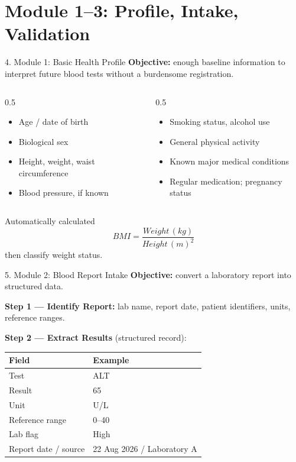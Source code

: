 \documentclass[10pt,aspectratio=169]{beamer}
\begin{document}
\section{Module 1--3: Profile, Intake, Validation}

\begin{frame}{4. Module 1: Basic Health Profile}
\textbf{Objective:} enough baseline information to interpret future blood tests without a burdensome registration.
\vspace{4pt}
\scriptsize
\begin{columns}[T]
\begin{column}{0.5\textwidth}
\begin{itemize}
\item Age / date of birth
\item Biological sex
\item Height, weight, waist circumference
\item Blood pressure, if known
\end{itemize}
\end{column}
\begin{column}{0.5\textwidth}
\begin{itemize}
\item Smoking status, alcohol use
\item General physical activity
\item Known major medical conditions
\item Regular medication; pregnancy status
\end{itemize}
\end{column}
\end{columns}
\vfill
\begin{exampleblock}{Automatically calculated}
$$BMI = \dfrac{Weight\,(kg)}{Height\,(m)^2}$$ \quad then classify weight status.
\end{exampleblock}
\end{frame}

\begin{frame}{5. Module 2: Blood Report Intake}
\textbf{Objective:} convert a laboratory report into structured data.
\vspace{6pt}

\textbf{Step 1 --- Identify Report:} lab name, report date, patient identifiers, units, reference ranges.

\vspace{8pt}
\textbf{Step 2 --- Extract Results} (structured record):
\scriptsize
\begin{center}
\begin{tabular}{ll}
\toprule
Field & Example \\
\midrule
Test & ALT \\
Result & 65 \\
Unit & U/L \\
Reference range & 0--40 \\
Lab flag & High \\
Report date / source & 22 Aug 2026 / Laboratory A \\
\bottomrule
\end{tabular}
\end{center}
\end{frame}
\end{document}
